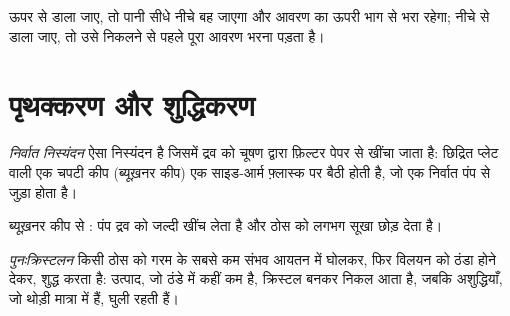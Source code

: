 \begin{remark}[पानी नीचे से अंदर]\label{rem:g10:synthesis-yield:water}
ऊपर से डाला जाए, तो पानी सीधे नीचे बह जाएगा और आवरण का ऊपरी भाग  से भरा
रहेगा; नीचे से डाला जाए, तो उसे निकलने से पहले पूरा आवरण
भरना पड़ता है।
\end{remark}

\section{पृथक्करण और शुद्धिकरण}

\begin{definition}[निर्वात निस्यंदन]\label{def:g10:synthesis-yield:vacuum-filtration}
\emph{निर्वात निस्यंदन} ऐसा निस्यंदन है जिसमें द्रव को
चूषण द्वारा फ़िल्टर पेपर से खींचा जाता है: छिद्रित प्लेट वाली एक चपटी
कीप (ब्यूख़नर कीप) एक साइड-आर्म फ़्लास्क पर बैठी होती है, जो एक निर्वात पंप से
जुड़ा होता है।
\end{definition}

\begin{omfigure}

{\small ब्यूख़नर कीप से : पंप द्रव को जल्दी खींच लेता है और
ठोस को लगभग सूखा छोड़ देता है।}
\end{omfigure}

\begin{definition}[पुनःक्रिस्टलन]\label{def:g10:synthesis-yield:recrystallisation}
\emph{पुनःक्रिस्टलन} किसी ठोस को गरम  के सबसे कम
संभव आयतन में घोलकर, फिर विलयन को ठंडा होने देकर, शुद्ध करता है: उत्पाद, जो ठंडे
में कहीं कम  है, क्रिस्टल बनकर निकल आता है, जबकि अशुद्धियाँ, जो थोड़ी मात्रा
में हैं, घुली रहती हैं।
\end{definition}


